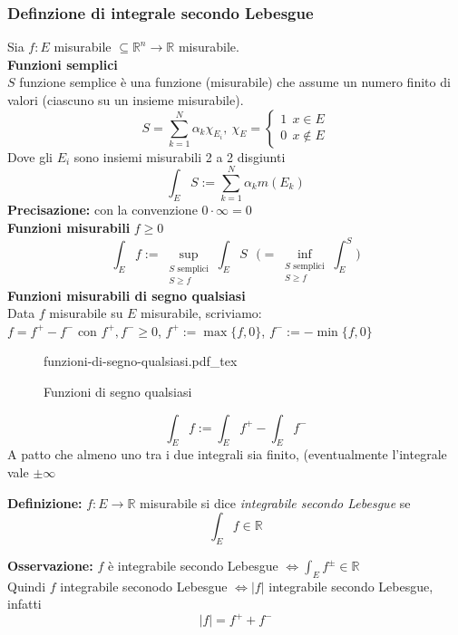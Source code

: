 \documentclass[a4paper]{article}
\newcommand{\incfig}[1]{%
	\def\svgwidth{\columnwidth}
	{#1.pdf_tex}
}
\newcommand{\R}{\mathbb{R}}
\begin{document}
\subsubsection{Definzione di integrale secondo Lebesgue}
Sia $f:E$ misurabile $\subseteq\R^n\to \R$ misurabile.
\\\textbf{Funzioni semplici}
\\$S$ funzione semplice è una funzione (misurabile) che assume un numero finito di valori (ciascuno su un insieme misurabile).
\[S=\sum_{k=1}^{N} \alpha_k\chi_{E_i},\ \chi_E=\begin{cases}
	1\ \ x\in E
	\\0\ \ x\not\in E
\end{cases}\]
Dove gli $E_i$ sono insiemi misurabili 2 a 2 disgiunti 
\[\int_{E}^{} S:=\sum_{k=1}^{N} \alpha_k m(E_k)\]
\textbf{Precisazione:} con la convenzione $0\cdot \infty=0$
\\\textbf{Funzioni misurabili} $f\ge 0$
\[\int_{E}^{} f:=\sup_{\substack{S \text{ semplici}\\S\ge  f}}\int_{E}^{}S\ \ \ \bigg(=\inf_{\substack{S \text{ semplici}\\S\ge f}} \int_{E}^{S}\bigg)\]
\textbf{Funzioni misurabili di segno qualsiasi}
\\Data $f$ misurabile su $E$ misurabile, scriviamo:
\\$f=f^+-f^-$ con $f^+,f^-\ge 0$, $f^+:=\max \{f,0\} $, $f^-:=-\min \{f,0\} $
\begin{figure}[ht]
    \centering
    \incfig{funzioni-di-segno-qualsiasi}
    \caption{Funzioni di segno qualsiasi}
    \label{fig:funzioni-di-segno-qualsiasi}
\end{figure}
\[\int_{E}^{} f:=\int_{E}^{} f^+-\int_{E}^{} f^-\]
A patto che almeno uno tra i due integrali sia finito, (eventualmente l'integrale vale $\pm \infty$
\begin{tcolorbox}
	\textbf{Definizione:} $f:E\to \R$ misurabile si dice \emph{integrabile secondo Lebesgue} se
	\[\int_{E}^{} f\in\R\] 
\end{tcolorbox}
\textbf{Osservazione:} $f$ è integrabile secondo Lebesgue $\iff \int_{E}^{} f^{\pm}\in\R $
\\Quindi $f$ integrabile seconodo Lebesgue $\iff|f|$ integrabile secondo Lebesgue, infatti
\[|f|=f^++f^-\]
\end{document}
